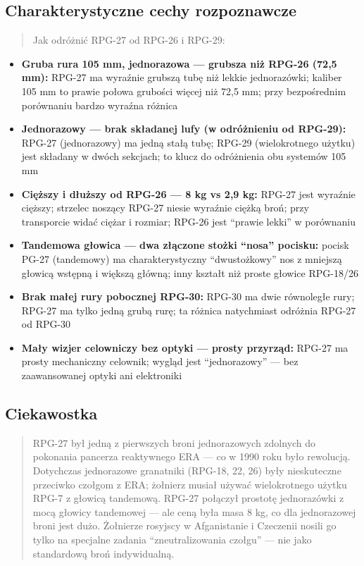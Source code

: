 \documentclass[12pt,oneside]{book}
\providecommand{\tightlist}{%
  \setlength{\itemsep}{0pt}\setlength{\parskip}{0pt}}
\begin{document}
\subsection{Charakterystyczne cechy
rozpoznawcze}\label{charakterystyczne-cechy-rozpoznawcze-87}

\begin{quote}
Jak odróżnić RPG-27 od RPG-26 i RPG-29:
\end{quote}

\begin{itemize}
\tightlist
\item
  \textbf{Gruba rura 105 mm, jednorazowa --- grubsza niż RPG-26 (72,5
  mm):} RPG-27 ma wyraźnie grubszą tubę niż lekkie jednorazówki; kaliber
  105 mm to prawie połowa grubości więcej niż 72,5 mm; przy bezpośrednim
  porównaniu bardzo wyraźna różnica
\item
  \textbf{Jednorazowy --- brak składanej lufy (w odróżnieniu od
  RPG-29):} RPG-27 (jednorazowy) ma jedną stałą tubę; RPG-29
  (wielokrotnego użytku) jest składany w dwóch sekcjach; to klucz do
  odróżnienia obu systemów 105 mm
\item
  \textbf{Cięższy i dłuższy od RPG-26 --- 8 kg vs 2,9 kg:} RPG-27 jest
  wyraźnie cięższy; strzelec noszący RPG-27 niesie wyraźnie ciężką broń;
  przy transporcie widać ciężar i rozmiar; RPG-26 jest ``prawie lekki''
  w porównaniu
\item
  \textbf{Tandemowa głowica --- dwa złączone stożki ``nosa'' pocisku:}
  pocisk PG-27 (tandemowy) ma charakterystyczny ``dwustożkowy'' nos z
  mniejszą głowicą wstępną i większą główną; inny kształt niż proste
  głowice RPG-18/26
\item
  \textbf{Brak małej rury pobocznej RPG-30:} RPG-30 ma dwie równoległe
  rury; RPG-27 ma tylko jedną grubą rurę; ta różnica natychmiast
  odróżnia RPG-27 od RPG-30
\item
  \textbf{Mały wizjer celowniczy bez optyki --- prosty przyrząd:} RPG-27
  ma prosty mechaniczny celownik; wygląd jest ``jednorazowy'' --- bez
  zaawansowanej optyki ani elektroniki
\end{itemize}

\subsection{Ciekawostka}\label{ciekawostka-87}

\begin{quote}
RPG-27 był jedną z pierwszych broni jednorazowych zdolnych do pokonania
pancerza reaktywnego ERA --- co w 1990 roku było rewolucją. Dotychczas
jednorazowe granatniki (RPG-18, 22, 26) były nieskuteczne przeciwko
czołgom z ERA; żołnierz musiał używać wielokrotnego użytku RPG-7 z
głowicą tandemową. RPG-27 połączył prostotę jednorazówki z mocą głowicy
tandemowej --- ale ceną była masa 8 kg, co dla jednorazowej broni jest
dużo. Żołnierze rosyjscy w Afganistanie i Czeczenii nosili go tylko na
specjalne zadania ``zneutralizowania czołgu'' --- nie jako standardową
broń indywidualną.
\end{quote}
\end{document}
